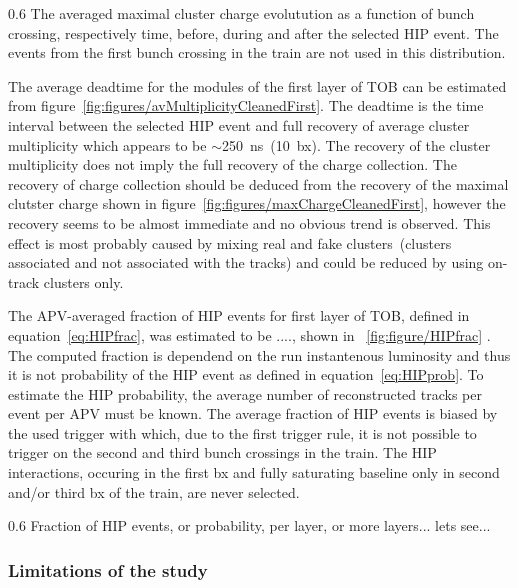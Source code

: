                  {0.6}       %
                 {The averaged maximal cluster charge evolutution as a function of bunch crossing, respectively time, before, during and after the selected HIP event.  The events from the first bunch crossing in the train are not used in this distribution. } %

The average deadtime for the modules of the first layer of TOB can be estimated from figure~\ref{fig:figures/avMultiplicityCleanedFirst}. The deadtime is the time interval between the selected HIP event and full recovery of average cluster multiplicity which appears to be $\sim$250~ns~(10~bx). The recovery of the cluster multiplicity does not imply the full recovery of the charge collection. The recovery of charge collection should be deduced from the recovery of the maximal clutster charge shown in figure~\ref{fig:figures/maxChargeCleanedFirst}, however the recovery seems to be almost immediate and no obvious trend is observed. This effect is most probably caused by mixing real and fake clusters~(clusters associated and not associated with the tracks) and could be reduced by using on-track clusters only.

The APV-averaged fraction of HIP events for first layer of TOB, defined in equation~\ref{eq:HIPfrac}, was estimated to be ...., shown in ~\ref{fig:figure/HIPfrac} . The computed fraction is dependend on the run instantenous luminosity and thus it is not probability of the HIP event as defined in equation~\ref{eq:HIPprob}. To estimate the HIP probability, the average number of reconstructed tracks per event per APV must be known. The average fraction of HIP events is biased by the used trigger with which, due to the first trigger rule, it is not possible to trigger on the second and third bunch crossings in the train. The HIP interactions, occuring in the first bx and fully saturating baseline only in second and/or third bx of the train, are never selected.
 
                 {0.6}       %
                 {Fraction of HIP events, or probability, per layer, or more layers... lets see... } %

\subsubsection{Limitations of the study}

